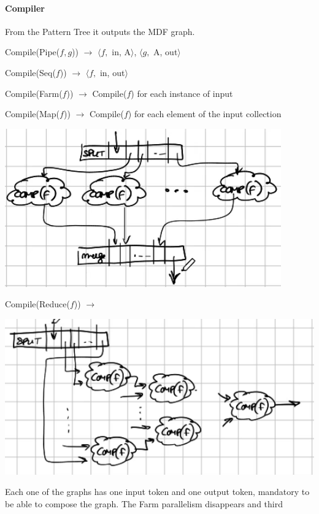 \documentclass[10pt]{report}
\begin{document}
\paragraph{Compiler} From the Pattern Tree it outputs the MDF graph.
\begin{list}{}{}
	\item Compile(Pipe($f,g$)) $\rightarrow$ $\langle f,$ in, A$\rangle$, $\langle g,$ A, out$\rangle$
	\item Compile(Seq($f$)) $\rightarrow$ $\langle f,$ in, out$\rangle$
	\item Compile(Farm($f$)) $\rightarrow$ Compile($f$) for each instance of input
	\item Compile(Map($f$)) $\rightarrow$ Compile($f$) for each element of the input collection
	\begin{center}
		\includegraphics[scale=0.5]{9.png}
	\end{center}
	\item Compile(Reduce($f$)) $\rightarrow$ \begin{center}
		\includegraphics[scale=0.5]{10.png}
	\end{center}
\end{list}
Each one of the graphs has one input token and one output token, mandatory to be able to compose the graph. The Farm parallelism disappears %
and third %
\end{document}
